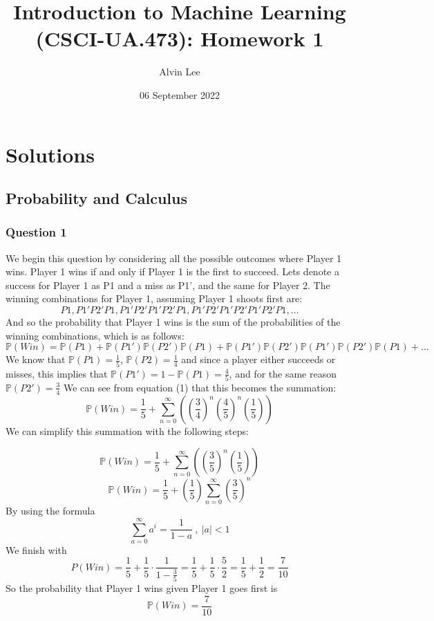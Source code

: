 \documentclass{article}
\title{Introduction to Machine Learning (CSCI-UA.473): Homework 1}
\author{Alvin Lee}
\date{06 September 2022}
\begin{document}
\maketitle

\section*{Solutions}
\subsection*{Probability and Calculus}
\subsubsection*{Question 1}

We begin this question by considering all the possible outcomes where Player 1 wins.
Player 1 wins if and only if Player 1 is the first to succeed. Lets denote a success for 
Player 1 as P1 and a miss as P1', and the same for Player 2. The winning combinations for
Player 1, assuming Player 1 shoots first are:
\[P1, P1'P2'P1, P1'P2'P1'P2'P1, P1'P2'P1'P2'P1'P2'P1, \ldots\]
And so the probability that Player 1 wins is the sum of the probabilities of the winning combinations, 
which is as follows:
\begin{equation}
  \mathbb{P}(Win) = \mathbb{P}(P1) + \mathbb{P}(P1')\mathbb{P}(P2')\mathbb{P}(P1) + \mathbb{P}(P1')\mathbb{P}(P2')\mathbb{P}(P1')\mathbb{P}(P2')\mathbb{P}(P1) + \ldots
\end{equation}
We know that $\mathbb{P}(P1) = \frac{1}{5}$, $\mathbb{P}(P2) = \frac{1}{4}$ and since a player either succeeds or misses, this implies that
$\mathbb{P}(P1') = 1 - \mathbb{P}(P1) = \frac{4}{5}$, and for the same reason $\mathbb{P}(P2') = \frac{3}{4}$
We can see from equation (1) that this becomes the summation:
\begin{equation}
  \mathbb{P}(Win) = \frac{1}{5} + \sum_{n=0}^{\infty}
    \left(
      \left({\frac{3}{4}}\right)^{n}
      \left(\frac{4}{5}\right)^n
      \left(\frac{1}{5}\right)
    \right)
\end{equation}
We can simplify this summation with the following steps:

\[
  \mathbb{P}(Win) = \frac{1}{5} + \sum_{n=0}^{\infty}
    \left(
      \left({\frac{3}{5}}\right)^{n}
      \left(\frac{1}{5}\right)
    \right)
\]
\[
  \mathbb{P}(Win) = \frac{1}{5} + \left(\frac{1}{5}\right)
  \sum_{n=0}^{\infty}\left({\frac{3}{5}}\right)^{n}
\]
By using the formula
\begin{equation}
\sum_{a=0}^{\infty}{a^i} = \frac{1}{1-a}\ , \ |a| < 1
\end{equation}
We finish with 
\[
  P(Win) = \frac{1}{5} + \frac{1}{5}\cdot
  \frac{1}{1-\frac{3}{5}} = \frac{1}{5} + \frac{1}{5}\cdot\frac{5}{2}
  = \frac{1}{5} + \frac{1}{2} = \frac{7}{10}
\]
So the probability that Player 1 wins given Player 1 goes first is
\begin{equation}
  \mathbb{P}(Win) = \frac{7}{10}
\end{equation}
\end{document}
